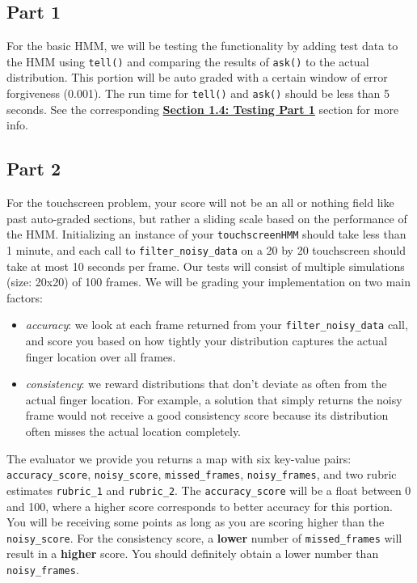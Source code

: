 \documentclass{article}
\begin{document}
    \subsection{Part 1}
    For the basic HMM, we will be testing the functionality by adding test data to the HMM using \texttt{tell()} and comparing the results of \texttt{ask()} to the actual distribution. This portion will be auto graded with a certain window of error forgiveness (0.001). The run time for \texttt{tell()} and \texttt{ask()} should be less than 5 seconds. See the corresponding \hyperref[subsec:testingpart1]{\textbf{Section 1.4: Testing Part 1}} section for more info.
    \subsection{Part 2}
    \label{subsec:part2grading}
        For the touchscreen problem, your score will not be an all or nothing field like past auto-graded sections, but rather a sliding scale based on the performance of the HMM. Initializing an instance of your \texttt{touchscreenHMM} should take less than 1 minute, and each call to \texttt{filter\_noisy\_data} on a 20 by 20 touchscreen should take at most 10 seconds per frame. Our tests will consist of multiple simulations (size: 20x20) of 100 frames. We will be grading your implementation on two main factors:
        \begin{itemize}
        \item \textit{accuracy}: we look at each frame returned from your \texttt{filter\_noisy\_data} call, and score you based on how tightly your distribution captures the actual finger location over all frames.
        \item \textit{consistency}: we reward distributions that don't deviate as often from the actual finger location. For example, a solution that simply returns the noisy frame would not receive a good consistency score because its distribution often misses the actual location completely.
        \end{itemize}
        The evaluator we provide you returns a map with six key-value pairs: \texttt{accuracy\_score}, \texttt{noisy\_score}, \texttt{missed\_frames}, \texttt{noisy\_frames}, and two rubric estimates \texttt{rubric\_1} and \texttt{rubric\_2}. The \texttt{accuracy\_score} will be a float between 0 and 100, where a higher score corresponds to better accuracy for this portion. You will be receiving some points as long as you are scoring higher than the \texttt{noisy\_score}. For the consistency score, a \textbf{lower} number of \texttt{missed\_frames} will result in a \textbf{higher} score. You should definitely obtain a lower number than \texttt{noisy\_frames}. \\\\
\end{document}
